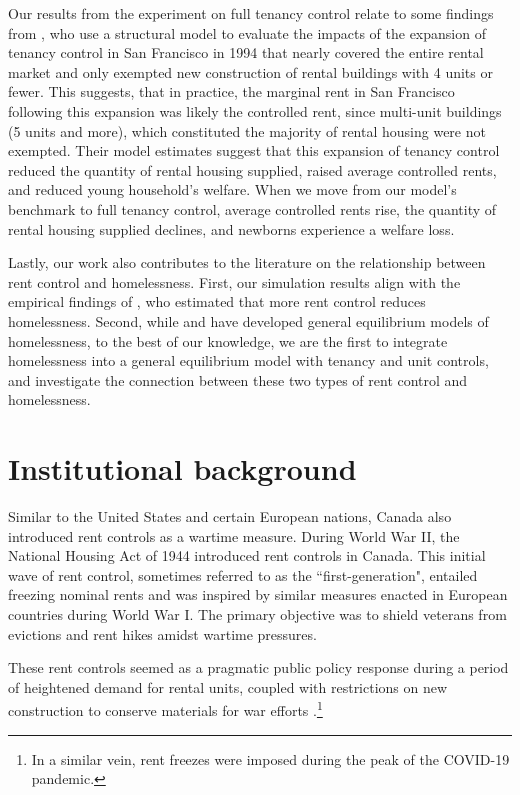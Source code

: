 \documentclass[parskip=full]{article}
\begin{document}
Our results from the experiment on full tenancy control relate to some findings from \citet{dmq-2019}, who use a structural model to evaluate the impacts of the expansion of tenancy control in San Francisco in 1994 that nearly covered the entire rental market and only exempted new construction of rental buildings with 4 units or fewer. This suggests, that in practice, the marginal rent in San Francisco following this expansion was likely the controlled rent, since multi-unit buildings (5 units and more), which constituted the majority of rental housing were not exempted. Their model estimates suggest that this expansion of tenancy control reduced the quantity of rental housing supplied, raised average controlled rents, and reduced young household's welfare. When we move from our model's benchmark to full tenancy control, average controlled rents rise, the quantity of rental housing supplied declines, and newborns experience a welfare loss. 

Lastly, our work also contributes to the literature on the relationship between rent control and homelessness. First, our simulation results align with the empirical findings of \citet{eo-1998}, who estimated that more rent control reduces homelessness. Second, while \citet{az-2024} and \citet{abramson-2024} have developed general equilibrium models of homelessness, to the best of our knowledge, we are the first to integrate homelessness into a general equilibrium model with tenancy and unit controls, and investigate the connection between these two types of rent control and homelessness.

\section{Institutional background}\label{sec:insitutional_background}

Similar to the United States and certain European nations, Canada also introduced rent controls as a wartime measure. During World War II, the National Housing Act of 1944 introduced rent controls in Canada. This initial wave of rent control, sometimes referred to as the ``first-generation", entailed freezing nominal rents and was inspired by similar measures enacted in European countries during World War I. The primary objective was to shield veterans from evictions and rent hikes amidst wartime pressures.

These rent controls seemed as a pragmatic public policy response during a period of heightened demand for rental units, coupled with restrictions on new construction to conserve materials for war efforts \citep{downs-1988}.\footnote{In a similar vein, rent freezes were imposed during the peak of the COVID-19 pandemic.}
\end{document}
